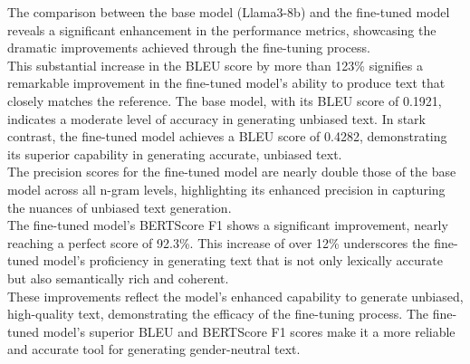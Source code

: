 \documentclass{solutionclass} %
\begin{document}
\begin{solution}
The comparison between the base model (Llama3-8b) and the fine-tuned model reveals a significant enhancement in the performance metrics, showcasing the dramatic improvements achieved through the fine-tuning process.\\

This substantial increase in the BLEU score by more than 123\% signifies a remarkable improvement in the fine-tuned model’s ability to produce text that closely matches the reference. The base model, with its BLEU score of 0.1921, indicates a moderate level of accuracy in generating unbiased text. In stark contrast, the fine-tuned model achieves a BLEU score of 0.4282, demonstrating its superior capability in generating accurate, unbiased text.\\

The precision scores for the fine-tuned model are nearly double those of the base model across all n-gram levels, highlighting its enhanced precision in capturing the nuances of unbiased text generation.\\

The fine-tuned model’s BERTScore F1 shows a significant improvement, nearly reaching a perfect score of 92.3\%. This increase of over 12\% underscores the fine-tuned model's proficiency in generating text that is not only lexically accurate but also semantically rich and coherent.\\

These improvements reflect the model’s enhanced capability to generate unbiased, high-quality text, demonstrating the efficacy of the fine-tuning process. The fine-tuned model's superior BLEU and BERTScore F1 scores make it a more reliable and accurate tool for generating gender-neutral text.
\end{solution}
\end{document}

